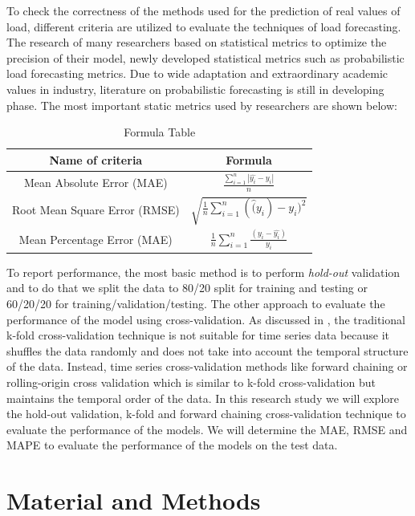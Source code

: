 \documentclass[mstat,12pt]{unswthesis}
\begin{document}
To check the correctness of the methods used for the prediction of real
values of load, different criteria are utilized to evaluate the
techniques of load forecasting. The research of many researchers based
on statistical metrics to optimize the precision of their model, newly
developed statistical metrics such as probabilistic load forecasting
metrics. Due to wide adaptation and extraordinary academic values in
industry, literature on probabilistic forecasting is still in developing
phase. The most important static metrics used by researchers are shown
below:

\begin{table}[h]
\centering
\caption{Formula Table}
\begin{tabular}{|c|c|}
\hline
\textbf{Name of criteria} & \textbf{Formula} \\ 
\hline
Mean Absolute Error (MAE) & $\frac{\sum_{i=1}^n|\hat{y_i}-y_i|}{n}$ \\ 
\hline
Root Mean Square Error (RMSE) & $\sqrt{\frac{1}{n}\sum_{i=1}^{n}(\hat(y_i) - y_i)^2}$ \\ 
\hline
Mean Percentage Error (MAE) & $\frac{1}{n}\sum_{i=1}^{n}\frac{(y_i-\hat{y_i})}{y_i}$ \\ 
\hline
\end{tabular}
\end{table}

To report performance, the most basic method is to perform
\emph{hold-out} validation and to do that we split the data to 80/20
split for training and testing or 60/20/20 for
training/validation/testing. The other approach to evaluate the
performance of the model using cross-validation. As discussed in
\cite{rafferty2023forecasting}, the traditional k-fold cross-validation
technique is not suitable for time series data because it shuffles the
data randomly and does not take into account the temporal structure of
the data. Instead, time series cross-validation methods like forward
chaining or rolling-origin cross validation which is similar to k-fold
cross-validation but maintains the temporal order of the data. In this
research study we will explore the hold-out validation, k-fold and
forward chaining cross-validation technique to evaluate the performance
of the models. We will determine the MAE, RMSE and MAPE to evaluate the
performance of the models on the test data.

\chapter{Material and Methods}\label{material-and-methods}
\end{document}
